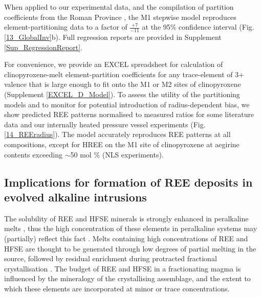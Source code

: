 \documentclass[review,authoryear,12pt]{elsarticle}
\begin{document}
When applied to our experimental data, and the compilation of partition coefficients from the Roman Province \citep{Fedele2009, Mollo2013, Mollo2016}, the M1 stepwise model reproduces element-partitioning data to a factor of $\frac{+7}{-11}$ at the 95\% confidence interval (Fig. \ref{13_GlobalInv}b). Full regression reports are provided in Supplement \ref{Sup_RegressionReport}. 


For convenience, we provide an EXCEL spreadsheet for calculation of clinopyroxene-melt element-partition coefficients for any trace-element of 3+ valence that is large enough to fit onto the M1 or M2 sites of clinopyroxene (Supplement \ref{EXCEL_D_Model}). 
	To assess the utility of the partitioning models and to monitor for potential introduction of radius-dependent bias, we show predicted REE patterns normalised to measured ratios for some literature data and our internally heated pressure vessel experiments (Fig. \ref{14_REEradius}). The model accurately reproduces REE patterns at all compositions, except for HREE on the M1 site of clinopyroxene at aegirine contents exceeding $\sim$50 mol \% (NLS experiments).

		                         

\subsection{Implications for formation of REE deposits in evolved alkaline intrusions}
The solubility of REE and HFSE minerals is strongly enhanced in peralkaline melts \citep{Watson1979, Linnen1997, Boehnke2013, Aseri2015}, thus the high concentration of these elements in peralkaline systems may (partially) reflect this fact \citep{Dostal2017}. Melts containing high concentrations of REE and HFSE are thought to be generated through low degrees of partial melting in the source, followed by residual enrichment during protracted fractional crystallisation \citep{Marks2017}. The budget of REE and HFSE in a fractionating magma is influenced by the mineralogy of the crystallising assemblage, and the extent to which these elements are incorporated at minor or trace concentrations.
\end{document}
